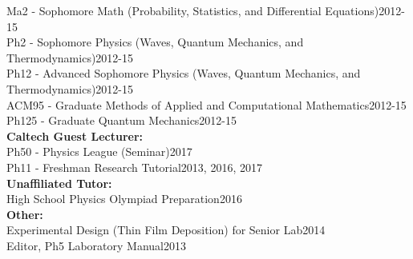 \documentclass[line, margin]{res3address}
\begin{document}
\begin{resume}
\phantom{4ex} Ma2 - Sophomore Math (Probability, Statistics, and Differential Equations)\hfill 2012-15\\
\phantom{4ex} Ph2 - Sophomore Physics (Waves, Quantum Mechanics, and Thermodynamics)\hfill 2012-15\\
\phantom{4ex} Ph12 - Advanced Sophomore Physics (Waves, Quantum Mechanics, and Thermodynamics)\hfill 2012-15\\
\phantom{4ex} ACM95 - Graduate Methods of Applied and Computational Mathematics\hfill 2012-15\\
\phantom{4ex} Ph125 - Graduate Quantum Mechanics\hfill 2012-15\\
\textbf{Caltech Guest Lecturer:}\\
\phantom{4ex} Ph50 - Physics League (Seminar)\hfill 2017\\
\phantom{4ex} Ph11 - Freshman Research Tutorial\hfill 2013, 2016, 2017\\
\textbf{Unaffiliated Tutor:}\\
\phantom{4ex} High School Physics Olympiad Preparation\hfill 2016\\
\textbf{Other:}\\
\phantom{4ex} Experimental Design (Thin Film Deposition) for Senior Lab\hfill 2014\\
\phantom{4ex} Editor, Ph5 Laboratory Manual\hfill 2013


\end{resume}
\end{document}
